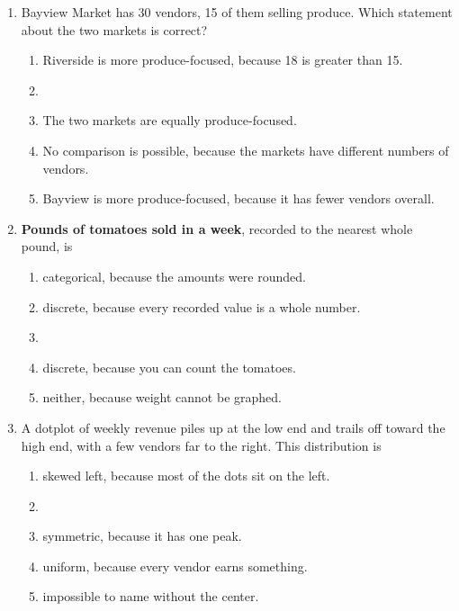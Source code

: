 \documentclass[12pt]{article}
\newcommand{\letterroom}{\rule[-15pt]{0pt}{36pt}}
\begin{document}
\begin{enumerate}[leftmargin=1.9em, itemsep=0.13in]
  \boxguard[9]
  \item Bayview Market has 30 vendors, 15 of them selling produce. Which statement about the
        two markets is correct?
        \begin{enumerate}[label=\textbf{(\Alph*)}, leftmargin=2.2em, itemsep=2pt]
          \item Riverside is more produce-focused, because 18 is greater than 15.
          \item {}
          \item The two markets are equally produce-focused.
          \item No comparison is possible, because the markets have different numbers of vendors.
          \item Bayview is more produce-focused, because it has fewer vendors overall.
                \hfill{}\letterroom
        \end{enumerate}

  \boxguard[9]
  \item \textbf{Pounds of tomatoes sold in a week}, recorded to the nearest whole pound, is
        \begin{enumerate}[label=\textbf{(\Alph*)}, leftmargin=2.2em, itemsep=2pt]
          \item categorical, because the amounts were rounded.
          \item discrete, because every recorded value is a whole number.
          \item {}
          \item discrete, because you can count the tomatoes.
          \item neither, because weight cannot be graphed.
                \hfill{}\letterroom
        \end{enumerate}

  \boxguard[9]
  \item A dotplot of weekly revenue piles up at the low end and trails off toward the high end,
        with a few vendors far to the right. This distribution is
        \begin{enumerate}[label=\textbf{(\Alph*)}, leftmargin=2.2em, itemsep=2pt]
          \item skewed left, because most of the dots sit on the left.
          \item {}
          \item symmetric, because it has one peak.
          \item uniform, because every vendor earns something.
          \item impossible to name without the center.
                \hfill{}\letterroom
        \end{enumerate}


\end{enumerate}
\end{document}
